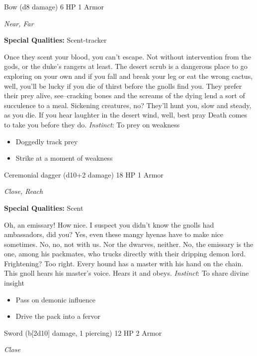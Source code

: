 Bow (d8 damage)\hspace*{\fill} 6 HP 1 Armor

\emph{Near, Far}

\textbf{Special Qualities:}
Scent-tracker

\HRule
Once they scent your blood, you can't escape. Not without intervention from the gods, or the duke's rangers at least. The desert scrub is a dangerous place to go exploring on your own and if you fall and break your leg or eat the wrong cactus, well, you'll be lucky if you die of thirst before the gnolls find you. They prefer their prey alive, see--cracking bones and the screams of the dying lend a sort of succulence to a meal. Sickening creatures, no? They'll hunt you, slow and steady, as you die. If you hear laughter in the desert wind, well, best pray Death comes to take you before they do. \emph{Instinct}: To prey on weakness
\begin{itemize}
\item Doggedly track prey
\item Strike at a moment of weakness
\end{itemize}

\HRule
{}

Ceremonial dagger (d10+2 damage)\hspace*{\fill} 18 HP 1 Armor

\emph{Close, Reach}

\textbf{Special Qualities:}
Scent

\HRule
Oh, an emissary! How nice. I suspect you didn't know the gnolls had ambassadors, did you? Yes, even these mangy hyenas have to make nice sometimes. No, no, not with us. Nor the dwarves, neither. No, the emissary is the one, among his packmates, who trucks directly with their dripping demon lord. Frightening? Too right. Every hound has a master with his hand on the chain. This gnoll hears his master's voice. Hears it and obeys. \emph{Instinct}: To share divine insight
\begin{itemize}
\item Pass on demonic influence
\item Drive the pack into a fervor
\end{itemize}
\newpage
\HRule
{}

Sword (b[2d10] damage, 1 piercing)\hspace*{\fill} 12 HP 2 Armor

\emph{Close}

